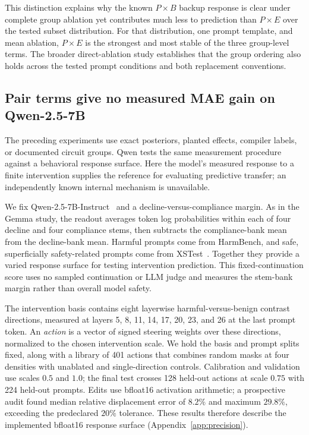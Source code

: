 \documentclass[sigconf,10pt,nonacm,balance=false]{acmart}
\begin{document}
This distinction explains why the known $P\times B$ backup response is clear under complete group ablation yet contributes much less to prediction than $P\times E$ over the tested subset distribution. For that distribution, one prompt template, and mean ablation, $P\times E$ is the strongest and most stable of the three group-level terms. The broader direct-ablation study establishes that the group ordering also holds across the tested prompt conditions and both replacement conventions.

\subsection{Pair terms give no measured MAE gain on Qwen-2.5-7B}\label{sec:qwen}

The preceding experiments use exact posteriors, planted effects, compiler labels, or documented circuit groups. Qwen tests the same measurement procedure against a behavioral response surface. Here the model's measured response to a finite intervention supplies the reference for evaluating predictive transfer; an independently known internal mechanism is unavailable.

We fix Qwen-2.5-7B-Instruct~\cite{qwen2025report} and a decline-versus-compliance margin. As in the Gemma study, the readout averages token log probabilities within each of four decline and four compliance stems, then subtracts the compliance-bank mean from the decline-bank mean. Harmful prompts come from HarmBench, and safe, superficially safety-related prompts come from XSTest~\cite{mazeika2024harmbench,rottger2024xstest}. Together they provide a varied response surface for testing intervention prediction. This fixed-continuation score uses no sampled continuation or LLM judge and measures the stem-bank margin rather than overall model safety.

The intervention basis contains eight layerwise harmful-versus-benign contrast directions, measured at layers 5, 8, 11, 14, 17, 20, 23, and 26 at the last prompt token. An \emph{action} is a vector of signed steering weights over these directions, normalized to the chosen intervention scale. We hold the basis and prompt splits fixed, along with a library of 401 actions that combines random masks at four densities with unablated and single-direction controls. Calibration and validation use scales $0.5$ and $1.0$; the final test crosses 128 held-out actions at scale $0.75$ with 224 held-out prompts. Edits use bfloat16 activation arithmetic; a prospective audit found median relative displacement error of $8.2\%$ and maximum $29.8\%$, exceeding the predeclared $20\%$ tolerance. These results therefore describe the implemented bfloat16 response surface (Appendix~\ref{app:precision}).
\end{document}
